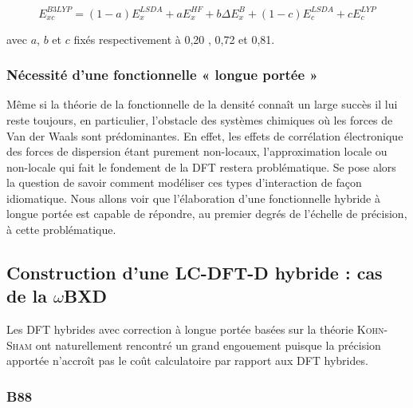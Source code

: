 	\begin{equation}
	E_{xc}^{B3LYP} = (1-a) E_{x}^{LSDA} + a E_{x}^{HF} + b \Delta E_{x}^{B} + (1-c) E_{c}^{LSDA} + c E_{c}^{LYP}
	\label{B3LYP}
	\end{equation}
	
	\noindent avec $a$, $b$ et $c$ fixés respectivement à 0,20 , 0,72 et 0,81.
	
	
	\subsubsection{Nécessité d'une fonctionnelle « longue portée »}
	
	Même si la théorie de la fonctionnelle de la densité connaît un large succès il lui reste toujours, en particulier, l'obstacle des systèmes chimiques où les forces de Van der Waals sont prédominantes. En effet, les effets de corrélation électronique des forces de dispersion étant purement non-locaux, l'approximation locale ou non-locale qui fait le fondement de la DFT restera problématique. Se pose alors la question de savoir comment modéliser ces types d'interaction de façon idiomatique. Nous allons voir que l'élaboration d'une fonctionnelle hybride à longue portée est capable de répondre, au premier degrés de l’échelle de précision, à cette problématique.
	
	\subsection[LC-DFT-D hybride : $\omega$BXD]{Construction d'une LC-DFT-D hybride : cas de la $\omega$BXD}
	Les DFT hybrides avec correction à longue portée basées sur la théorie \textsc{Kohn-Sham} ont naturellement rencontré un grand engouement puisque la précision apportée n'accroît pas le coût calculatoire par rapport aux DFT hybrides.
	
	\subsubsection{B88}
	
